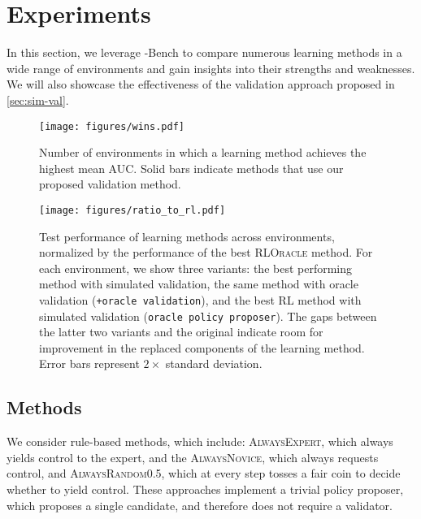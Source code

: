 \section{Experiments}\label{sec:experiments}


In this section, we leverage \ourMethod-Bench to compare numerous learning methods in a wide range of environments and gain insights into their strengths and weaknesses. 
We will also showcase the effectiveness of the validation approach proposed in \autoref{sec:sim-val}.

\begin{figure}[t]
\centering
    \texttt{[image: figures/wins.pdf]}
    \caption{Number of environments in which a learning method achieves the highest mean AUC. Solid bars indicate methods that use our proposed validation method.}
    \label{fig:method-comparison}
\end{figure}




\begin{figure*}[t]
\centering
    \texttt{[image: figures/ratio\_to\_rl.pdf]}
    \caption{Test performance of learning methods across environments, normalized by the performance of the best \textsc{RLOracle} method. For each environment, we show three variants: the best performing method with simulated validation, the same method with oracle validation (\texttt{+oracle validation}), and the best RL method with simulated validation (\texttt{oracle policy proposer}). The gaps between the latter two variants and the original indicate room for improvement in the replaced components of the learning method. Error bars represent $2\times$ standard deviation.}
    \label{fig:test-performance}
\end{figure*}


\subsection{Methods}\label{sec:exp_alg}

We consider rule-based methods, which include: \textsc{AlwaysExpert}, which always yields control to the expert, and the \textsc{AlwaysNovice}, which always requests control, and \textsc{AlwaysRandom0.5}, which at every step tosses a fair coin to decide whether to yield control. 
These approaches implement a trivial policy proposer, which proposes a single candidate, and therefore does not require a validator.

